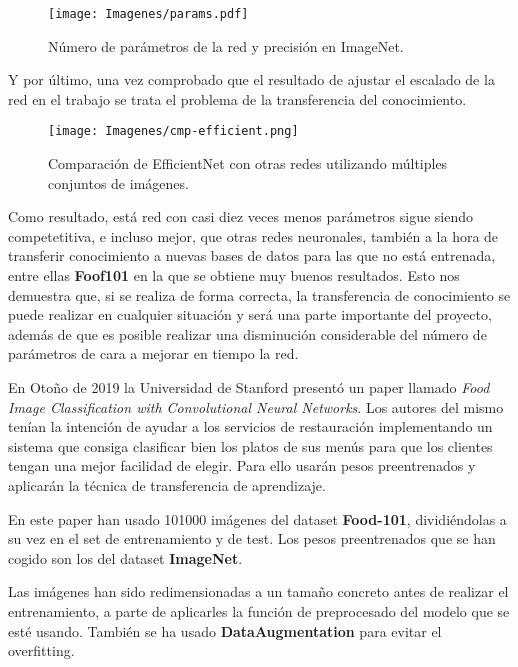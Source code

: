 \begin{figure}[H]
  \centering
  \texttt{[image: Imagenes/params.pdf]}
  \caption{Número de parámetros de la red y precisión en ImageNet.}
  \label{fig:param-precision}
\end{figure}

Y por último, una vez comprobado que el resultado de ajustar el escalado de la red en el trabajo se trata el problema de la transferencia del conocimiento.

\begin{figure}[H]
  \centering
  \texttt{[image: Imagenes/cmp-efficient.png]}
  \caption{Comparación de EfficientNet con otras redes utilizando múltiples conjuntos de imágenes.}
  \label{fig:param-precision}
\end{figure}

Como resultado, está red con casi diez veces menos parámetros sigue siendo competetitiva, e incluso mejor, que otras redes neuronales, también a la hora de transferir conocimiento a nuevas bases de datos para las que no está entrenada, entre ellas \textbf{Foof101} en la que se obtiene muy buenos resultados. Esto nos demuestra que, si se realiza de forma correcta, la transferencia de conocimiento se puede realizar en cualquier situación y será una parte importante del proyecto, además de que es posible realizar una disminución considerable del número de parámetros de cara a mejorar en tiempo la red.


\newpage

En Otoño de 2019 la Universidad de Stanford presentó un paper llamado \textit{Food Image Classification with Convolutional Neural Networks}. Los autores del mismo tenían la intención de ayudar a los servicios de restauración implementando un sistema que consiga clasificar bien los platos de sus menús para que los clientes tengan una mejor facilidad de elegir. Para ello usarán pesos preentrenados y aplicarán la técnica de transferencia de aprendizaje.

\vspace{3 mm}

En este paper han usado 101000 imágenes del dataset \textbf{Food-101}, dividiéndolas a su vez en el set de entrenamiento y de test. Los pesos preentrenados que se han cogido son los del dataset \textbf{ImageNet}.

\vspace{3 mm}

Las imágenes han sido redimensionadas a un tamaño concreto antes de realizar el entrenamiento, a parte de aplicarles la función de preprocesado del modelo que se esté usando. También se ha usado \textbf{DataAugmentation} para evitar el overfitting.

